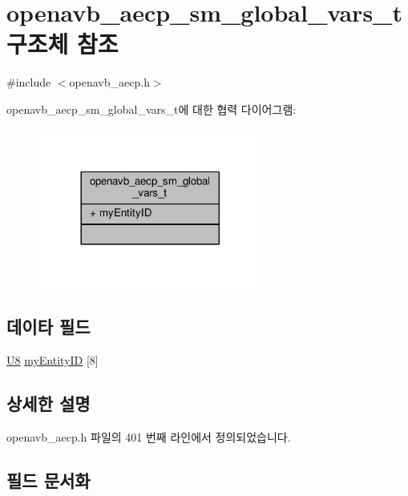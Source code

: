 \hypertarget{structopenavb__aecp__sm__global__vars__t}{}\section{openavb\+\_\+aecp\+\_\+sm\+\_\+global\+\_\+vars\+\_\+t 구조체 참조}
\label{structopenavb__aecp__sm__global__vars__t}


{\ttfamily \#include $<$openavb\+\_\+aecp.\+h$>$}



openavb\+\_\+aecp\+\_\+sm\+\_\+global\+\_\+vars\+\_\+t에 대한 협력 다이어그램\+:
\nopagebreak
\begin{figure}[H]
\begin{center}
\leavevmode
\includegraphics[width=209pt]{structopenavb__aecp__sm__global__vars__t__coll__graph}
\end{center}
\end{figure}
\subsection*{데이타 필드}
\begin{DoxyCompactItemize}
\item 
\hyperlink{openavb__types__base__pub_8h_aa63ef7b996d5487ce35a5a66601f3e73}{U8} \hyperlink{structopenavb__aecp__sm__global__vars__t_a52cd07952946e6772a284dd030d97afd}{my\+Entity\+ID} \mbox{[}8\mbox{]}
\end{DoxyCompactItemize}


\subsection{상세한 설명}


openavb\+\_\+aecp.\+h 파일의 401 번째 라인에서 정의되었습니다.



\subsection{필드 문서화}
